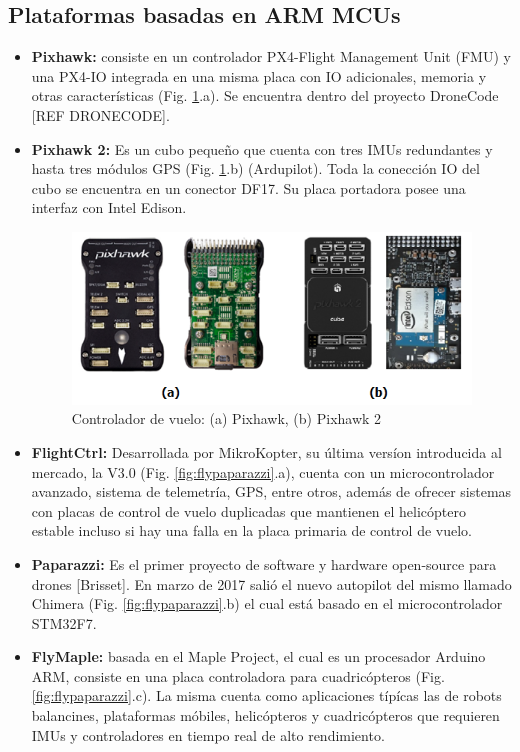 \subsection{Plataformas basadas en ARM MCUs}
\begin{itemize}
    \item \textbf{Pixhawk:} consiste en un controlador PX4-Flight Management Unit (FMU) y una PX4-IO integrada en una misma placa con IO adicionales, memoria y otras características (Fig. \ref{fig:pixhawks}.a). Se encuentra dentro del proyecto DroneCode [REF DRONECODE].
    \item \textbf{Pixhawk 2:} Es un cubo pequeño que cuenta con tres IMUs redundantes y hasta tres módulos GPS (Fig. \ref{fig:pixhawks}.b) (Ardupilot). Toda la conección IO del cubo se encuentra en un conector DF17. Su placa portadora posee una interfaz con Intel Edison.
    
    \begin{figure}
        \centering
        \includegraphics[width=.95\textwidth]{Img/pixhawks}
        \caption{Controlador de vuelo: (a) Pixhawk, (b) Pixhawk 2}
        \label{fig:pixhawks}
    \end{figure}
    
    \item \textbf{FlightCtrl:} Desarrollada por MikroKopter, su última versíon introducida al mercado, la V3.0 (Fig. \ref{fig:flypaparazzi}.a), cuenta con un microcontrolador avanzado, sistema de telemetría, GPS, entre otros, además de ofrecer sistemas con placas de control de vuelo duplicadas que mantienen el helicóptero estable incluso si hay una falla en la placa primaria de control de vuelo.
    \item \textbf{Paparazzi:} Es el primer proyecto de software y hardware open-source para drones [Brisset]. En marzo de 2017 salió el nuevo autopilot del mismo llamado Chimera (Fig. \ref{fig:flypaparazzi}.b) el cual está basado en el microcontrolador STM32F7.
    \item \textbf{FlyMaple:} basada en el Maple Project, el cual es un procesador Arduino ARM, consiste en una placa controladora para cuadricópteros (Fig. \ref{fig:flypaparazzi}.c). La misma cuenta como aplicaciones típícas las de robots balancines, plataformas móbiles, helicópteros y cuadricópteros que requieren IMUs y controladores en tiempo real de alto rendimiento.
    

\end{itemize}
